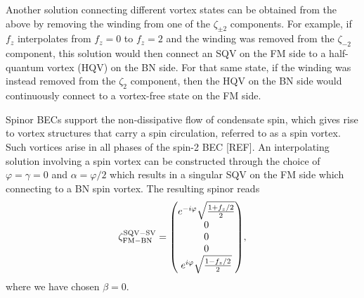 Another solution connecting different vortex states can be obtained from the
above by removing the winding from one of the \(\zeta_{\pm 2}\) components.
For example, if \(f_z\) interpolates from \(f_z=0\) to \(f_z=2\) and the winding
was removed from the \(\zeta_{-2}\) component, this solution would then connect
an SQV on the FM side to a half-quantum vortex (HQV) on the BN side.
For that same state, if the winding was instead removed from the \(\zeta_{2}\)
component, then the HQV on the BN side would continuously connect to a
vortex-free state on the FM side.

Spinor BECs support the non-dissipative flow of condensate spin, which gives
rise to vortex structures that carry a spin circulation, referred to as a spin
vortex.
Such vortices arise in all phases of the spin-2 BEC [REF].
An interpolating solution involving a spin vortex can be constructed through the
choice of \(\varphi=\gamma=0\) and \(\alpha=\varphi/2\) which results in a
singular SQV on the FM side which connecting to a BN spin vortex.
The resulting spinor reads
\begin{equation}
    \zeta_\mathrm{FM-BN}^\mathrm{SQV-SV} =
    \mqty(e^{-i\varphi}\sqrt{\frac{1 + f_z/2}{2}} \\ 0 \\ 0 \\ 0 \\
    e^{i\varphi}\sqrt{\frac{1 - f_z/2}{2}}),
\end{equation}
where we have chosen \(\beta = 0\).

